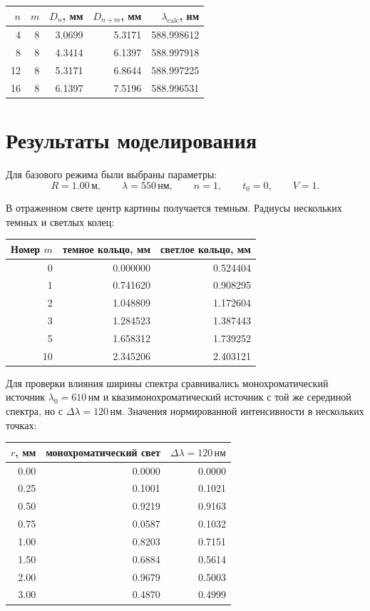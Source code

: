 \documentclass[12pt,a4paper]{article}
\begin{document}
\begin{table}[h]
\centering
\begin{tabular}{rrrrr}
\toprule
\(n\) & \(m\) & \(D_n\), мм & \(D_{n+m}\), мм & \(\lambda_{\mathrm{calc}}\), нм \\
\midrule
4  & 8 & 3.0699 & 5.3171 & 588.998612 \\
8  & 8 & 4.3414 & 6.1397 & 588.997918 \\
12 & 8 & 5.3171 & 6.8644 & 588.997225 \\
16 & 8 & 6.1397 & 7.5196 & 588.996531 \\
\bottomrule
\end{tabular}
\end{table}

\section{Результаты моделирования}

Для базового режима были выбраны параметры:
\[
R=1.00\,\mathrm{м},\qquad
\lambda=550\,\mathrm{нм},\qquad
n=1,\qquad
t_0=0,\qquad
V=1.
\]

В отраженном свете центр картины получается темным. Радиусы нескольких темных и светлых колец:

\begin{table}[h]
\centering
\begin{tabular}{rrr}
\toprule
Номер \(m\) & темное кольцо, мм & светлое кольцо, мм \\
\midrule
0  & 0.000000 & 0.524404 \\
1  & 0.741620 & 0.908295 \\
2  & 1.048809 & 1.172604 \\
3  & 1.284523 & 1.387443 \\
5  & 1.658312 & 1.739252 \\
10 & 2.345206 & 2.403121 \\
\bottomrule
\end{tabular}
\end{table}

Для проверки влияния ширины спектра сравнивались монохроматический источник
\(\lambda_0=610\,\mathrm{нм}\) и квазимонохроматический источник с той же серединой спектра, но с
\(\Delta\lambda=120\,\mathrm{нм}\). Значения нормированной интенсивности в нескольких точках:

\begin{table}[h]
\centering
\begin{tabular}{rrr}
\toprule
\(r\), мм & монохроматический свет & \(\Delta\lambda=120\,\mathrm{нм}\) \\
\midrule
0.00 & 0.0000 & 0.0000 \\
0.25 & 0.1001 & 0.1021 \\
0.50 & 0.9219 & 0.9163 \\
0.75 & 0.0587 & 0.1032 \\
1.00 & 0.8203 & 0.7151 \\
1.50 & 0.6884 & 0.5614 \\
2.00 & 0.9679 & 0.5003 \\
3.00 & 0.4870 & 0.4999 \\
\bottomrule
\end{tabular}
\end{table}
\end{document}
